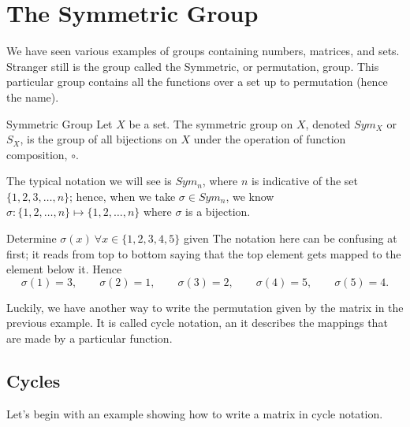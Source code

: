 \section{The Symmetric Group}

We have seen various examples of groups containing numbers, matrices, and sets. Stranger still is the group called the Symmetric, or permutation, group. This particular group contains all the functions over a set up to permutation (hence the name).

\begin{definition}{Symmetric Group}
	Let $X$ be a set. The symmetric group on $X$, denoted $Sym_{X}$ or $S_{X}$, is the group of all bijections on $X$ under the operation of function composition, $\circ$.
\end{definition}

The typical notation we will see is $Sym_{n}$, where $n$ is indicative of the set $\{1,2,3,\dots,n\}$; hence, when we take $\sigma\in Sym_{n}$, we know $\sigma:\{1,2,\dots,n\}\mapsto\{1,2,\dots,n\}$ where $\sigma$ is a bijection.

\begin{example}{Determine $\sigma(x)\ \forall x\in\{1,2,3,4,5\}$ given}
	{\egft{
		\[
			\left[
			\begin{array}{c c c c c}
				1 & 2 & 3 & 4 & 5 \\
				3 & 1 & 2 & 5 & 4
			\end{array}
			\right]
		\]
	}}
	The notation here can be confusing at first; it reads from top to bottom saying that the top element gets mapped to the element below it. Hence
	\[
		\sigma(1)=3,\qquad \sigma(2) = 1,\qquad \sigma(3)=2,\qquad \sigma(4)=5,\qquad\sigma(5)=4.
	\]
\end{example}
Luckily, we have another way to write the permutation given by the matrix in the previous example. It is called cycle notation, an it describes the mappings that are made by a particular function.

\subsection*{Cycles}
Let's begin with an example showing how to write a matrix in cycle notation.

